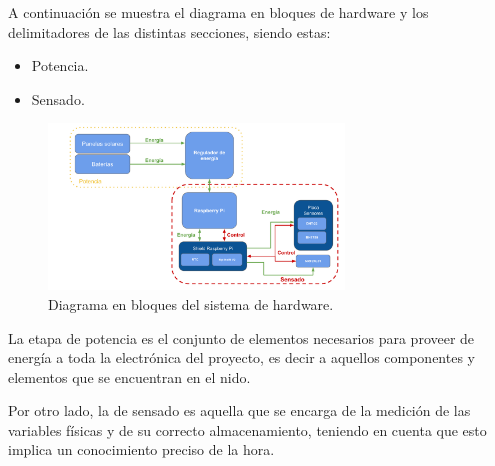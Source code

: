 A continuación se muestra el diagrama en bloques de hardware y los delimitadores de las distintas secciones, siendo estas:
\begin{itemize}
\item Potencia.
\item Sensado.
\end{itemize}

\begin{figure}[H]
	\centering
	\includegraphics[width=0.7\textwidth]{ImagenesIngenieria de Detalle/DiagramaHardwareMarcado}		
	\caption{Diagrama en bloques del sistema de hardware.}
	\label{fig:diagrama_hardware}
\end{figure}

La etapa de potencia es el conjunto de elementos necesarios para proveer de energía a toda la electrónica del proyecto, es decir a aquellos componentes y elementos que se encuentran en el nido.


Por otro lado, la de sensado es aquella que se encarga de la medición de las variables físicas y de su correcto almacenamiento, teniendo en cuenta que esto implica un conocimiento preciso de la hora.